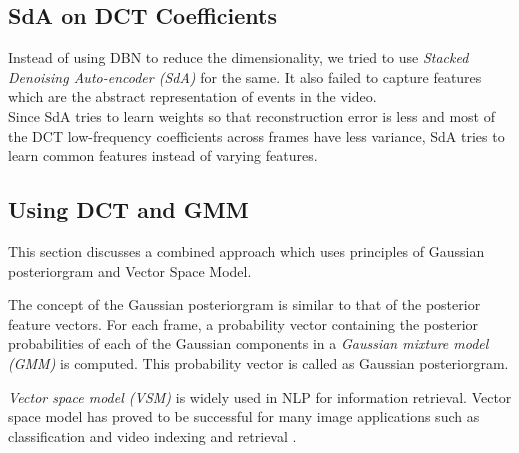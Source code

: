 \subsection{SdA on DCT Coefficients}
Instead of using DBN to reduce the dimensionality, we tried to use \textit{Stacked Denoising Auto-encoder (SdA)} for the same.  It also failed to capture features which are the abstract representation of events in the video.\\
Since SdA tries to learn weights so that reconstruction error is less and most of the DCT low-frequency coefficients across frames have less variance, SdA tries to learn common features instead of varying features.\\

\subsection{Using DCT and GMM}
\label{sec:event:dct_gmm}
This section discusses a combined approach which uses principles of Gaussian posteriorgram and Vector Space Model.

The concept of the Gaussian posteriorgram is similar to that of the posterior feature vectors\citep{zhang2010towards}.  For each frame, a probability vector containing the posterior probabilities of each of the Gaussian components in a \textit{Gaussian mixture model (GMM)} is computed.  This probability vector is called as  Gaussian posteriorgram.

\textit{Vector space model (VSM)} is widely used in NLP for information retrieval.  Vector space model has proved to be successful for many image applications such as classification and video indexing and retrieval \citep{galmar2007analysis}.

